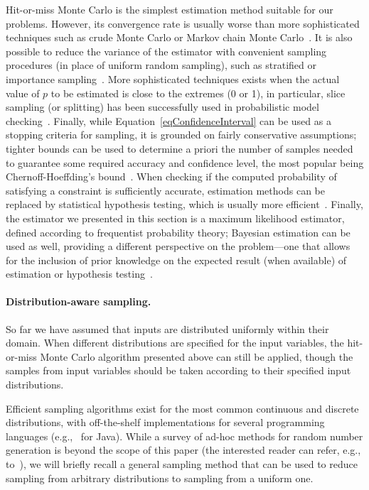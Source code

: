 Hit-or-miss Monte Carlo is the simplest estimation method suitable for our problems. However, its convergence rate is usually worse than more sophisticated techniques such as crude Monte Carlo or Markov chain Monte Carlo~\cite{Robert2005MCBook}. It is also possible to reduce the variance of the estimator with convenient sampling procedures (in place of uniform random sampling), such as stratified or importance sampling~\cite{Robert2005MCBook}. More sophisticated techniques exists when the actual value of $p$ to be estimated is close to the extremes (0 or 1), in particular, slice sampling (or splitting) has been successfully used in probabilistic model checking~\cite{importanceSamplingSMC,splittingSMC,statisticalModelChecking}. Finally, while Equation~\eqref{eqConfidenceInterval} can be used as a stopping criteria for sampling, it is grounded on fairly conservative assumptions; tighter bounds can be used to determine a priori the number of samples needed to guarantee some required accuracy and confidence level, the most popular being Chernoff-Hoeffding's bound~\cite{hoeffding1963probability,approximatePMC,statisticalModelChecking}. When checking if the computed probability of satisfying a constraint is sufficiently accurate, estimation methods can be replaced by statistical hypothesis testing, which is usually more efficient~\cite{pestman1998mathematical}. Finally, the estimator we presented in this section is a maximum likelihood estimator, defined according to frequentist probability theory; Bayesian estimation can be used as well, providing a different perspective on the problem---one that allows for the inclusion of prior knowledge on the expected result (when available) of estimation or hypothesis testing~\cite{Robert2007BayesianChoice,gelman2003bayesian}.



\paragraph{Distribution-aware sampling.} So far we have assumed that inputs are distributed uniformly within their domain. When different distributions are specified for the input variables, the hit-or-miss Monte Carlo algorithm presented above can still be applied, though the samples from input variables should be taken according to their specified input distributions.

Efficient sampling algorithms exist for the most common continuous and discrete distributions, with off-the-shelf implementations for several programming languages (e.g.,~\cite{commonsMath3} for Java). While a survey of ad-hoc methods for random number generation is beyond the scope of this paper (the interested reader can refer, e.g., to~\cite{gentle2013random}), we will briefly recall a general sampling method that can be used to reduce sampling from arbitrary distributions to sampling from a uniform one. 

